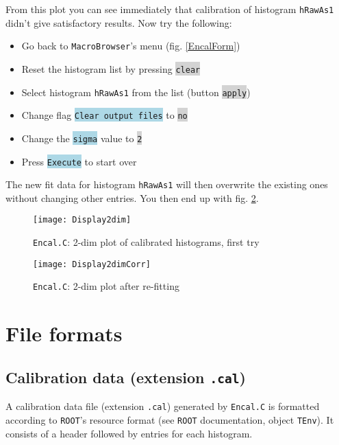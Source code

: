 \documentclass[10pt]{article}
\newcommand{\blue}[1]{\colorbox{lightblue}{\texttt{#1}}}
\newcommand{\gray}[1]{\colorbox{lightgray}{\texttt{#1}}}
\begin{document}
From this plot you can see immediately that calibration of histogram \texttt{hRawAs1}
didn't give satisfactory results. Now try the following:
\begin{center}
\begin{itemize}
\setlength{\rightmargin}{1em}%
\setlength{\leftmargin}{2em}%
\setlength{\itemsep}{0pt}%
\setlength{\parskip}{1mm}%
\setlength{\partopsep}{0pt}%
\setlength{\parsep}{0pt}%
\setlength{\topsep}{0pt}%
\item	Go back to \texttt{MacroBrowser}'s menu (fig. \ref{EncalForm})
\item	Reset the histogram list by pressing \gray{clear}
\item	Select histogram \texttt{hRawAs1} from the list (button \gray{apply})
\item	Change flag \blue{Clear output files} to \gray{no}
\item	Change the \blue{sigma} value to \gray{2}
\item	Press \blue{Execute} to start over
\end{itemize}\vspace{.5cm}
\end{center}
The new fit data for histogram \texttt{hRawAs1} will then overwrite the existing ones without changing other entries. You then end up with
fig. \ref{Display2dimCorr}.
\newpage
\begin{figure}[H]
\centerline{\texttt{[image: Display2dim]}}
\caption{\texttt{Encal.C}: 2-dim plot of calibrated histograms, first try}
\label{Display2dim}
\end{figure}
\begin{figure}[H]
\centerline{\texttt{[image: Display2dimCorr]}}
\caption{\texttt{Encal.C}: 2-dim plot after re-fitting}
\label{Display2dimCorr}
\end{figure}
\newpage
\section{File formats}
\subsection{Calibration data (extension \texttt{.cal})}\label{CalFileFormat}
A calibration data file (extension \texttt{.cal}) generated by \texttt{Encal.C}
is formatted according to \texttt{ROOT}'s resource format (see \texttt{ROOT} documentation, object \texttt{TEnv}).
It consists of a header followed by entries for each histogram.
\end{document}
